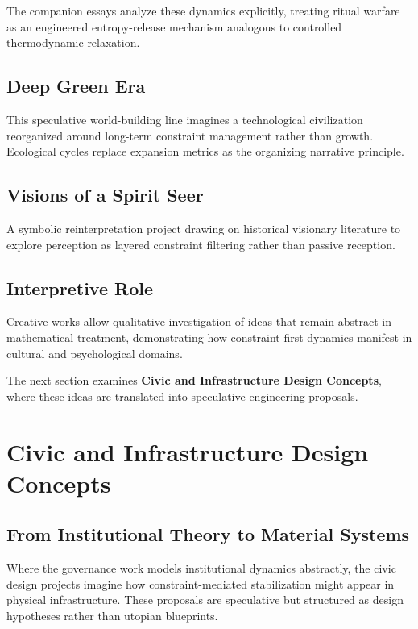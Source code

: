 \documentclass[12pt]{article}
\begin{document}
The companion essays analyze these dynamics explicitly, treating ritual warfare as an engineered entropy-release mechanism analogous to controlled thermodynamic relaxation.

\subsection{Deep Green Era}

This speculative world-building line imagines a technological civilization reorganized around long-term constraint management rather than growth. Ecological cycles replace expansion metrics as the organizing narrative principle.

\subsection{Visions of a Spirit Seer}

A symbolic reinterpretation project drawing on historical visionary literature to explore perception as layered constraint filtering rather than passive reception.

\subsection{Interpretive Role}

Creative works allow qualitative investigation of ideas that remain abstract in mathematical treatment, demonstrating how constraint-first dynamics manifest in cultural and psychological domains.

\bigskip

The next section examines \textbf{Civic and Infrastructure Design Concepts}, where these ideas are translated into speculative engineering proposals.

\section{Civic and Infrastructure Design Concepts}

\subsection{From Institutional Theory to Material Systems}

Where the governance work models institutional dynamics abstractly, the civic design projects imagine how constraint-mediated stabilization might appear in physical infrastructure. These proposals are speculative but structured as design hypotheses rather than utopian blueprints.
\end{document}
